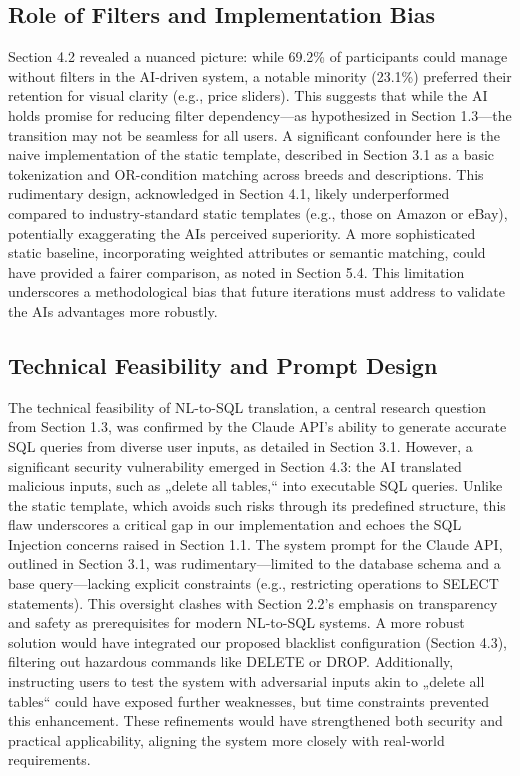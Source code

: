 \documentclass[../../submission.tex]{subfiles}
\begin{document}
\subsection{Role of Filters and Implementation Bias}
Section 4.2 revealed a nuanced picture: while 69.2\% of participants could manage without 
filters in the AI-driven system, a notable minority (23.1\%) preferred their retention for visual 
clarity (e.g., price sliders). This suggests that while the AI holds promise for reducing filter 
dependency—as hypothesized in Section 1.3—the transition may not be seamless for all users. A 
significant confounder here is the naive implementation of the static template, described in Section 
3.1 as a basic tokenization and OR-condition matching across breeds and descriptions. This rudimentary 
design, acknowledged in Section 4.1, likely underperformed compared to industry-standard static 
templates (e.g., those on Amazon or eBay), potentially exaggerating the AIs perceived superiority. 
A more sophisticated static baseline, incorporating weighted attributes or semantic matching, could 
have provided a fairer comparison, as noted in Section 5.4. This limitation underscores a methodological 
bias that future iterations must address to validate the AIs advantages more robustly.

\subsection{Technical Feasibility and Prompt Design}
The technical feasibility of NL-to-SQL translation, a central research 
question from Section 1.3, was confirmed by the Claude API’s ability to 
generate accurate SQL queries from diverse user inputs, as detailed in 
Section 3.1. However, a significant security vulnerability emerged in 
Section 4.3: the AI translated malicious inputs, such as „delete all tables,“ 
into executable SQL queries. Unlike the static template, which avoids 
such risks through its predefined structure, this flaw underscores a 
critical gap in our implementation and echoes the SQL Injection concerns 
raised in Section 1.1. The system prompt for the Claude API, outlined in 
Section 3.1, was rudimentary—limited to the database schema and a base 
query—lacking explicit constraints 
(e.g., restricting operations to SELECT statements). This 
oversight clashes with Section 2.2’s emphasis on transparency
and safety as prerequisites for modern NL-to-SQL systems. A more 
robust solution would have integrated our proposed blacklist 
configuration (Section 4.3), filtering 
out hazardous commands like DELETE or DROP. Additionally, instructing 
users to test the system with adversarial inputs akin to „delete all tables“ 
could have exposed further weaknesses, but time constraints prevented 
this enhancement. These refinements would have strengthened both 
security and practical applicability, aligning the system more 
closely with real-world requirements.
\end{document}
